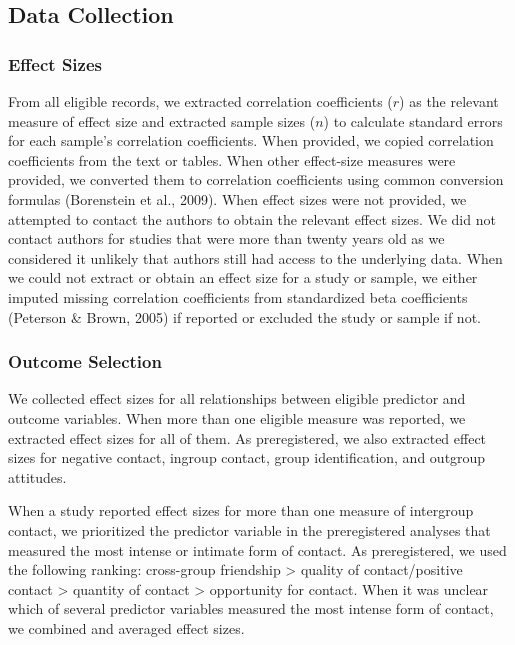 \documentclass[12pt, letterpaper]{article}
\begin{document}
\hypertarget{data-collection}{%
\subsection{Data Collection}\label{data-collection}}

\hypertarget{effect-sizes}{%
\subsubsection{Effect Sizes}\label{effect-sizes}}

From all eligible records, we extracted correlation coefficients (\(r\))
as the relevant measure of effect size and extracted sample sizes
(\(n\)) to calculate standard errors for each sample's correlation
coefficients. When provided, we copied correlation coefficients from the
text or tables. When other effect-size measures were provided, we
converted them to correlation coefficients using common conversion
formulas (Borenstein et al., 2009). When effect sizes were not provided,
we attempted to contact the authors to obtain the relevant effect sizes.
We did not contact authors for studies that were more than twenty years
old as we considered it unlikely that authors still had access to the
underlying data. When we could not extract or obtain an effect size for
a study or sample, we either imputed missing correlation coefficients
from standardized beta coefficients (Peterson \& Brown, 2005) if
reported or excluded the study or sample if not.

\hypertarget{outcome-selection}{%
\subsubsection{Outcome Selection}\label{outcome-selection}}

We collected effect sizes for all relationships between eligible
predictor and outcome variables. When more than one eligible measure was
reported, we extracted effect sizes for all of them. As preregistered,
we also extracted effect sizes for negative contact, ingroup contact,
group identification, and outgroup attitudes.

When a study reported effect sizes for more than one measure of
intergroup contact, we prioritized the predictor variable in the
preregistered analyses that measured the most intense or intimate form
of contact. As preregistered, we used the following ranking: cross-group
friendship \textgreater{} quality of contact/positive contact
\textgreater{} quantity of contact \textgreater{} opportunity for
contact. When it was unclear which of several predictor variables
measured the most intense form of contact, we combined and averaged
effect sizes.
\end{document}
